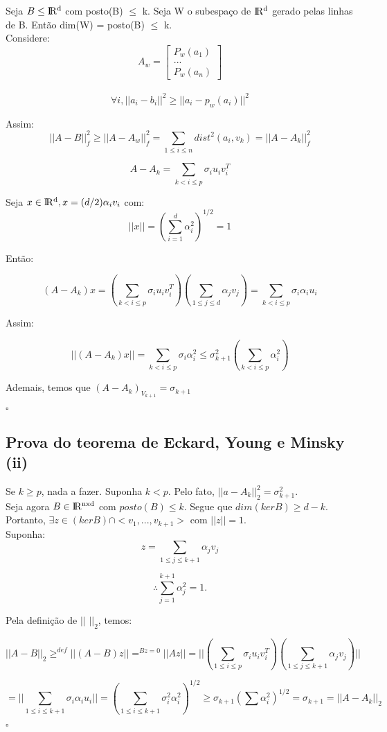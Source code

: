 Seja $B \leq {\rm I\!R^{d}}$ com posto(B) $\leq $ k. Seja W o subespaço de ${\rm I\!R^{d}}$ gerado pelas linhas de B. Então dim(W) = posto(B) $\leq$ k.\\

Considere:
\begin{equation*}
A_w =  
\begin{bmatrix}
P_w(a_1)\\ ...\\P_w(a_n)
\end{bmatrix}
\end{equation*}\\

\[ \forall i,||a_i-b_i||^2\geq ||a_i-p_w(a_i)||^2\]

Assim:
\[||A-B||^2_f\geq ||A-A_w||_f^2 = \sum_{1\leq i\leq n} dist^2(a_i,v_k) = ||A-A_k||^2_f \]

\[A-A_k = \sum_{k<i\leq p}\sigma_iu_iv_i^T \]

Seja $x \in {\rm I\!R^d}, x=(d/2)\alpha_iv_i$ com:
\[||x||=(\sum_{i=1}^d\alpha_i^2)^{1/2}=1\]
 
Então:

\[(A-A_k)x = (\sum_{k<i\leq p}\sigma_iu_iv_i^T)(\sum_{1\leq j\leq d}\alpha_jv_j)=\sum_{k<i\leq p}\sigma_i\alpha_i u_i\]

Assim: 

\[||(A-A_k)x||= \sum_{k<i\leq p}\sigma_i \alpha_i^2 \leq \sigma_{k+1}^2(\sum_{k<i\leq p} \alpha_i^2) \]

Ademais, temos que $(A-A_k)_{V_{k+1}}=\sigma_{k+1}$

\begin{flushright}
$\square$
\end{flushright}

\subsection{Prova do teorema de Eckard, Young e Minsky (ii)}

Se $k \geq p$, nada a fazer. Suponha $k<p$. Pelo fato, $||a-A_k||_2^2=\sigma_{k+1}^2$.\\

Seja agora $B \in {\rm I\!R^{nxd}}$ com $posto(B)\leq k$. Segue que $dim(ker B)\geq d-k$. Portanto, $\exists z \in (ker B) \cap <v_1,...,v_{k+1}>$ com $||z||=1$.\\

Suponha: \[z=\sum_{1\leq j\leq k+1}\alpha_j v_j\]

\[\therefore \sum_{j=1}^{k+1}\alpha_j^2 = 1.\]

Pela definição de $||$ $||_2$, temos:

\[||A-B||_2 \geq^{def} ||(A-B)z|| =^{Bz=0} ||Az||=||(\sum_{1\leq i\leq p}\sigma_iu_iv_i^T)(\sum_{1\leq j\leq k+1}\alpha_j v_j)||\]

\[=||\sum_{1\leq i\leq k+1}\sigma_i\alpha_iu_i||=(\sum_{1\leq i\leq k+1}\sigma_i^2\alpha_i^2)^{1/2}\geq \sigma_{k+1}(\sum\alpha_i^2)^{1/2}=\sigma_{k+1}=||A-A_k||_2  \]

\begin{flushright}
$\square$
\end{flushright}


